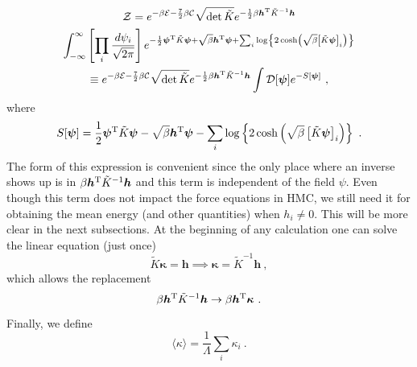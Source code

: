 \documentclass[11pt]{article}
\begin{document}
\begin{multline}\label{eqn:Z}
\mathcal{Z}=e^{-\beta\mathcal{E}-\frac{7}{2}\beta\mathcal{C}}\sqrt{\operatorname{det}\tilde K}e^{-\frac{1}{2} \beta \bm h^{\rm T} \tilde{K}^{-1} \bm h}\\
\int_{-\infty}^{\infty}\left[\prod_{i} \frac{d \psi_{i}}{\sqrt{2 \pi}}\right]
e^{-\frac{1}{2}\bm\psi^{\rm T} \tilde K\bm \psi+\sqrt{\beta}\bm h^{\rm T}\bm\psi+\sum_i\log\left\{2\cosh\left(\sqrt{\beta}\left[\tilde{K}\bm \psi\right]_i\right)\right\}}\\
\equiv e^{-\beta\mathcal{E}-\frac{7}{2}\beta\mathcal{C}}\sqrt{\operatorname{det}\tilde K}e^{-\frac{1}{2} \beta \bm h^{\rm T} \tilde{K}^{-1} \bm h}
\int\mathcal{D}[\bm\psi]
e^{-S[\bm\psi]}\ ,
\end{multline}
where
\begin{equation}
S[\bm\psi]=\frac{1}{2}\bm\psi^{\rm T} \tilde K\bm \psi-\sqrt{\beta}\bm h^{\rm T}\bm\psi-\sum_i\log\left\{2\cosh\left(\sqrt{\beta}\left[\tilde{K}\bm \psi\right]_i\right)\right\}\ .
\end{equation}
The form of this expression is convenient since the only place where an inverse shows up is in $\beta \bm h^{\rm T} \tilde{K}^{-1} \bm h$ and this term is independent of the field $\psi$.  Even though this term does not impact the force equations in HMC, we still need it for obtaining the mean energy (and other quantities) when $h_i\ne 0$.  This will be more clear in the next subsections.  At the beginning of any calculation one can solve the linear equation (just once)
\begin{displaymath}
\tilde K\bm\kappa =\bm h\implies \bm \kappa = \tilde K^{-1}\bm h\ ,
\end{displaymath}
which allows the replacement
\begin{displaymath}
\beta \bm h^{\rm T} \tilde{K}^{-1} \bm h\rightarrow\beta \bm h^{\rm T}\bm \kappa\ .
\end{displaymath}
Finally, we define 
\begin{equation}
\langle \kappa\rangle =\frac{1}{\Lambda}\sum_i\kappa_i\ .
\end{equation}
\end{document}
